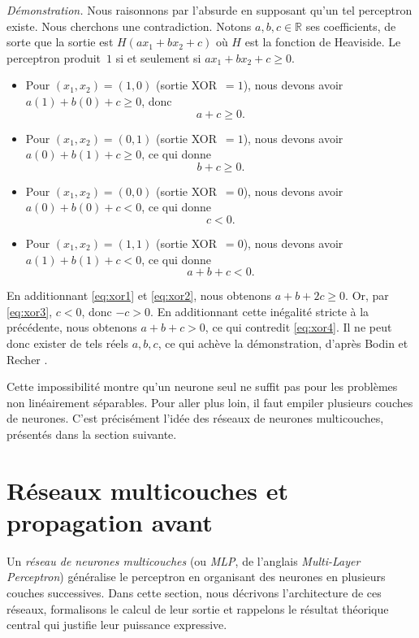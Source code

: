 \documentclass[a4paper,french]{style-LaTeX}
\begin{document}
\textit{Démonstration.} Nous raisonnons par l'absurde en supposant qu'un tel perceptron existe. Nous cherchons une contradiction. Notons $a, b, c \in \mathbb{R}$ ses coefficients, de sorte que la sortie est $H(ax_1 + bx_2 + c)$ où $H$ est la fonction de Heaviside. Le perceptron produit~$1$ si et seulement si $ax_1 + bx_2 + c \geq 0$.
\begin{itemize}
  \item Pour $(x_1,x_2)=(1,0)$ (sortie XOR~$=1$), nous devons avoir $a(1)+b(0)+c \geq 0$, donc
  \begin{equation}
    a + c \geq 0. \label{eq:xor1}
  \end{equation}
  \item Pour $(x_1,x_2)=(0,1)$ (sortie XOR~$=1$), nous devons avoir $a(0)+b(1)+c \geq 0$, ce qui donne
  \begin{equation}
    b + c \geq 0. \label{eq:xor2}
  \end{equation}
  \item Pour $(x_1,x_2)=(0,0)$ (sortie XOR~$=0$), nous devons avoir $a(0)+b(0)+c < 0$, ce qui donne
  \begin{equation}
    c < 0. \label{eq:xor3}
  \end{equation}
  \item Pour $(x_1,x_2)=(1,1)$ (sortie XOR~$=0$), nous devons avoir $a(1)+b(1)+c < 0$, ce qui donne
  \begin{equation}
    a + b + c < 0. \label{eq:xor4}
  \end{equation}
\end{itemize}
En additionnant \eqref{eq:xor1} et \eqref{eq:xor2}, nous obtenons $a+b+2c \geq 0$. Or, par \eqref{eq:xor3}, $c < 0$, donc $-c > 0$. En additionnant cette inégalité stricte à la précédente, nous obtenons $a+b+c > 0$, ce qui contredit \eqref{eq:xor4}. Il ne peut donc exister de tels réels $a, b, c$, ce qui achève la démonstration, d'après Bodin et Recher \cite{Exo7deepmath}.

Cette impossibilité montre qu'un neurone seul ne suffit pas pour les problèmes non linéairement séparables. Pour aller plus loin, il faut empiler plusieurs couches de neurones. C'est précisément l'idée des réseaux de neurones multicouches, présentés dans la section suivante.


\section{Réseaux multicouches et propagation avant}

Un \emph{réseau de neurones multicouches} (ou \emph{MLP}, de l'anglais \emph{Multi-Layer Perceptron}) généralise le perceptron en organisant des neurones en plusieurs couches successives. Dans cette section, nous décrivons l'architecture de ces réseaux, formalisons le calcul de leur sortie et rappelons le résultat théorique central qui justifie leur puissance expressive.
\end{document}
